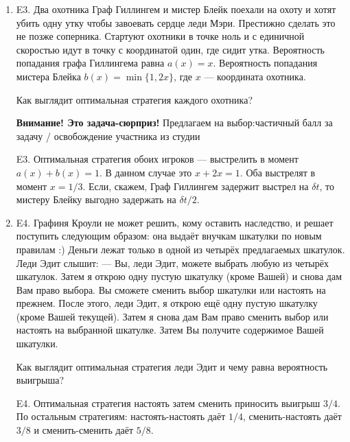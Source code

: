 \documentclass[12pt]{article}
\newenvironment{problem}{}{}
\newenvironment{sol}{}{} %
\begin{document}
\begin{enumerate}
\begin{problem}
\item[E3.] 
Два охотника Граф Гиллингем и мистер Блейк поехали на охоту и хотят убить одну утку чтобы завоевать сердце леди Мэри. Престижно сделать это не позже соперника. Стартуют охотники в точке ноль и с единичной скоростью идут в точку с координатой один, где сидит утка. Вероятность попадания графа Гиллингема равна $a(x)=x$. Вероятность попадания мистера Блейка $b(x)=\min\{1, 2x\}$, где $x$ — координата охотника.

Как выглядит оптимальная стратегия каждого охотника?

\begin{sol}
\textbf{Внимание! Это задача-сюрприз!} Предлагаем на выбор:частичный балл за задачу / освобождение участника из студии

E3. Оптимальная стратегия обоих игроков — выстрелить в момент $a(x)+b(x)=1$. В данном случае это $x+2x=1$. Оба выстрелят в момент $x=1/3$. Если, скажем, Граф Гиллингем задержит выстрел на $\delta t$, то мистеру Блейку выгодно задержать на $\delta t/2$.
\end{sol}
\end{problem}

\begin{problem}
\item[E4.] Графиня Кроули не может решить, кому оставить наследство, и решает поступить следующим образом: она выдаёт внучкам шкатулки по новым правилам :) Деньги лежат только в одной из четырёх предлагаемых шкатулок. Леди Эдит слышит:
— Вы, леди Эдит, можете выбрать любую из четырёх шкатулок. Затем я открою одну пустую шкатулку (кроме Вашей) и снова дам Вам право выбора. Вы сможете сменить выбор шкатулки или настоять на прежнем. После этого, леди Эдит, я открою ещё одну пустую шкатулку (кроме Вашей текущей). Затем я снова дам Вам право сменить выбор или настоять на выбранной шкатулке. Затем Вы получите содержимое Вашей шкатулки.

Как выглядит оптимальная стратегия леди Эдит и чему равна вероятность выигрыша?

\begin{sol}
E4. Оптимальная стратегия настоять затем сменить приносить выигрыш $3/4$. По остальным стратегиям: настоять-настоять даёт $1/4$, сменить-настоять даёт $3/8$ и сменить-сменить даёт $5/8$.
\end{sol}
\end{problem}


\end{enumerate}
\end{document}
